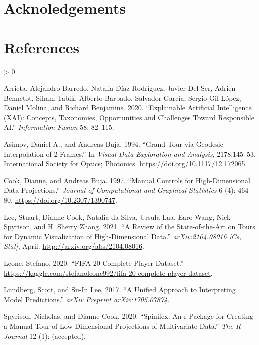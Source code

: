 \documentclass[
]{article}
\newlength{\cslhangindent}
\newenvironment{CSLReferences}[2] %
 {%
  \setlength{\parindent}{0pt}
  \ifodd #1 \everypar{\setlength{\hangindent}{\cslhangindent}}\ignorespaces\fi
  \ifnum #2 > 0
  \setlength{\parskip}{#2\baselineskip}
  \fi
 }%
 {}
\begin{document}
\hypertarget{acknoledgements}{%
\section{Acknoledgements}\label{acknoledgements}}

\hypertarget{references}{%
\section*{References}\label{references}}

\hypertarget{refs}{}
\begin{CSLReferences}{1}{0}
\leavevmode\hypertarget{ref-arrieta_explainable_2020}{}%
Arrieta, Alejandro Barredo, Natalia Díaz-Rodríguez, Javier Del Ser, Adrien Bennetot, Siham Tabik, Alberto Barbado, Salvador García, Sergio Gil-López, Daniel Molina, and Richard Benjamins. 2020. {``Explainable {Artificial} {Intelligence} ({XAI}): {Concepts}, Taxonomies, Opportunities and Challenges Toward Responsible {AI}.''} \emph{Information Fusion} 58: 82--115.

\leavevmode\hypertarget{ref-asimov_grand_1994}{}%
Asimov, Daniel A., and Andreas Buja. 1994. {``Grand Tour via Geodesic Interpolation of 2-Frames.''} In \emph{Visual Data Exploration and Analysis}, 2178:145--53. International Society for Optics; Photonics. \url{https://doi.org/10.1117/12.172065}.

\leavevmode\hypertarget{ref-cook_manual_1997}{}%
Cook, Dianne, and Andreas Buja. 1997. {``Manual Controls for High-Dimensional Data Projections.''} \emph{Journal of Computational and Graphical Statistics} 6 (4): 464--80. \url{https://doi.org/10.2307/1390747}.

\leavevmode\hypertarget{ref-lee_review_2021}{}%
Lee, Stuart, Dianne Cook, Natalia da Silva, Ursula Laa, Earo Wang, Nick Spyrison, and H. Sherry Zhang. 2021. {``A {Review} of the {State}-of-the-{Art} on {Tours} for {Dynamic} {Visualization} of {High}-{Dimensional} {Data}.''} \emph{arXiv:2104.08016 {[}Cs, Stat{]}}, April. \url{http://arxiv.org/abs/2104.08016}.

\leavevmode\hypertarget{ref-leone_fifa_2020}{}%
Leone, Stefano. 2020. {``{FIFA} 20 Complete Player Dataset.''} \url{https://kaggle.com/stefanoleone992/fifa-20-complete-player-dataset}.

\leavevmode\hypertarget{ref-lundberg_unified_2017}{}%
Lundberg, Scott, and Su-In Lee. 2017. {``A Unified Approach to Interpreting Model Predictions.''} \emph{arXiv Preprint arXiv:1705.07874}.

\leavevmode\hypertarget{ref-spyrison_spinifex_2020}{}%
Spyrison, Nicholas, and Dianne Cook. 2020. {``Spinifex: An r Package for Creating a Manual Tour of Low-Dimensional Projections of Multivariate Data.''} \emph{The R Journal} 12 (1): (accepted).

\end{CSLReferences}
\end{document}
